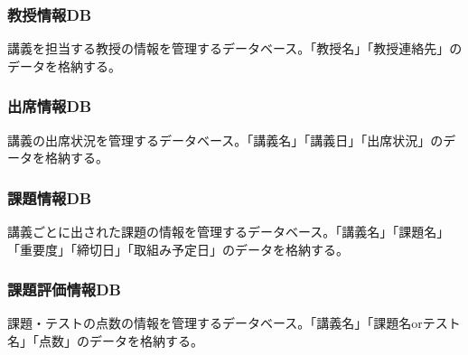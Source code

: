 \documentclass[a4paper, 11pt, titlepage]{jsarticle}
\begin{document}
\subsubsection{教授情報DB}
講義を担当する教授の情報を管理するデータベース。「教授名」「教授連絡先」のデータを格納する。
\subsubsection{出席情報DB}
講義の出席状況を管理するデータベース。「講義名」「講義日」「出席状況」のデータを格納する。
\subsubsection{課題情報DB}
講義ごとに出された課題の情報を管理するデータベース。「講義名」「課題名」「重要度」「締切日」「取組み予定日」のデータを格納する。
\subsubsection{課題評価情報DB}
課題・テストの点数の情報を管理するデータベース。「講義名」「課題名orテスト名」「点数」のデータを格納する。
\end{document}
